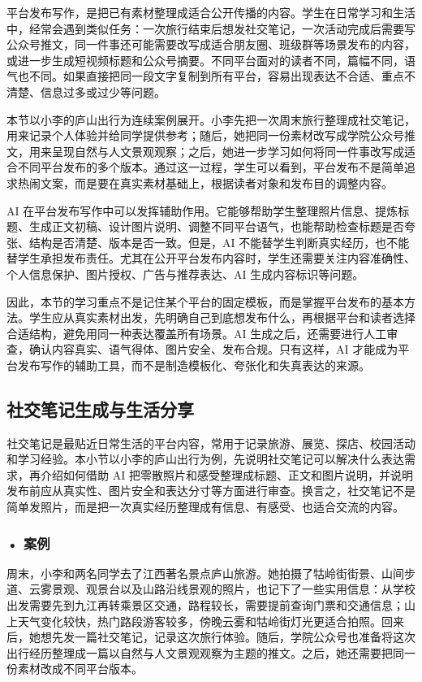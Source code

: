 平台发布写作，是把已有素材整理成适合公开传播的内容。学生在日常学习和生活中，经常会遇到类似任务：一次旅行结束后想发社交笔记，一次活动完成后需要写公众号推文，同一件事还可能需要改写成适合朋友圈、班级群等场景发布的内容，或进一步生成短视频标题和公众号摘要。不同平台面对的读者不同，篇幅不同，语气也不同。如果直接把同一段文字复制到所有平台，容易出现表达不合适、重点不清楚、信息过多或过少等问题。

本节以小李的庐山出行为连续案例展开。小李先把一次周末旅行整理成社交笔记，用来记录个人体验并给同学提供参考；随后，她把同一份素材改写成学院公众号推文，用来呈现自然与人文景观观察；之后，她进一步学习如何将同一件事改写成适合不同平台发布的多个版本。通过这一过程，学生可以看到，平台发布不是简单追求热闹文案，而是要在真实素材基础上，根据读者对象和发布目的调整内容。

AI 在平台发布写作中可以发挥辅助作用。它能够帮助学生整理照片信息、提炼标题、生成正文初稿、设计图片说明、调整不同平台语气，也能帮助检查标题是否夸张、结构是否清楚、版本是否一致。但是，AI 不能替学生判断真实经历，也不能替学生承担发布责任。尤其在公开平台发布内容时，学生还需要关注内容准确性、个人信息保护、图片授权、广告与推荐表达、AI 生成内容标识等问题。

因此，本节的学习重点不是记住某个平台的固定模板，而是掌握平台发布的基本方法。学生应从真实素材出发，先明确自己到底想发布什么，再根据平台和读者选择合适结构，避免用同一种表达覆盖所有场景。AI 生成之后，还需要进行人工审查，确认内容真实、语气得体、图片安全、发布合规。只有这样，AI 才能成为平台发布写作的辅助工具，而不是制造模板化、夸张化和失真表达的来源。


\subsection{社交笔记生成与生活分享}

社交笔记是最贴近日常生活的平台内容，常用于记录旅游、展览、探店、校园活动和学习经验。本小节以小李的庐山出行为例，先说明社交笔记可以解决什么表达需求，再介绍如何借助 AI 把零散照片和感受整理成标题、正文和图片说明，并说明发布前应从真实性、图片安全和表达分寸等方面进行审查。换言之，社交笔记不是简单发照片，而是把一次真实经历整理成有信息、有感受、也适合交流的内容。

\subsubsection*{\textbf{• 案例}}

周末，小李和两名同学去了江西著名景点庐山旅游。她拍摄了牯岭街街景、山间步道、云雾景观、观景台以及山路沿线景观的照片，也记下了一些实用信息：从学校出发需要先到九江再转乘景区交通，路程较长，需要提前查询门票和交通信息；山上天气变化较快，热门路段游客较多，傍晚云雾和牯岭街灯光更适合拍照。回来后，她想先发一篇社交笔记，记录这次旅行体验。随后，学院公众号也准备将这次出行经历整理成一篇以自然与人文景观观察为主题的推文。之后，她还需要把同一份素材改成不同平台版本。


